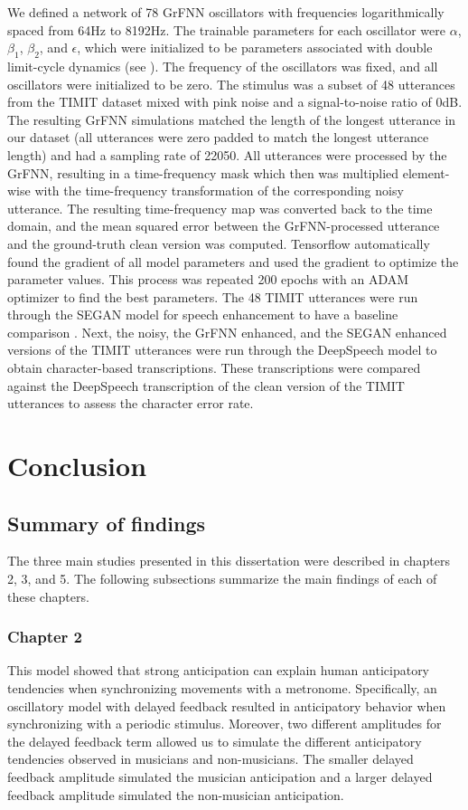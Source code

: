 \documentclass{report}
\begin{document}
We defined a network of 78 GrFNN oscillators with frequencies logarithmically spaced from 64Hz to 8192Hz. The trainable parameters for each oscillator were $\alpha$, $\beta_1$, $\beta_2$, and $\epsilon$, which were initialized to be parameters associated with double limit-cycle dynamics (see \cite{kim2015signal}). The frequency of the oscillators was fixed, and all oscillators were initialized to be zero. The stimulus was a subset of 48 utterances from the TIMIT dataset \cite{garofolo1993timit} mixed with pink noise and a signal-to-noise ratio of 0dB. The resulting GrFNN simulations matched the length of the longest utterance in our dataset (all utterances were zero padded to match the longest utterance length) and had a sampling rate of 22050. All utterances were processed by the GrFNN, resulting in a time-frequency mask which then was multiplied element-wise with the time-frequency transformation of the corresponding noisy utterance. The resulting time-frequency map was converted back to the time domain, and the mean squared error between the GrFNN-processed utterance and the ground-truth clean version was computed. Tensorflow automatically found the gradient of all model parameters and used the gradient to optimize the parameter values. This process was repeated 200 epochs with an ADAM optimizer \cite{kingma2014adam} to find the best parameters. The 48 TIMIT utterances were run through the SEGAN model for speech enhancement to have a baseline comparison \cite{pascual2017segan}. Next, the noisy, the GrFNN enhanced, and the SEGAN enhanced versions of the TIMIT utterances were run through the DeepSpeech model \cite{hannun2014deep} to obtain character-based transcriptions. These transcriptions were compared against the DeepSpeech transcription of the clean version of the TIMIT utterances to assess the character error rate. 


\chapter{Conclusion}

\section{Summary of findings}
The three main studies presented in this dissertation were described in chapters 2, 3, and 5. The following subsections summarize the main findings of each of these chapters.

\subsection{Chapter 2}
This model showed that strong anticipation can explain human anticipatory tendencies when synchronizing movements with a metronome. Specifically, an oscillatory model with delayed feedback resulted in anticipatory behavior when synchronizing with a periodic stimulus. Moreover, two different amplitudes for the delayed feedback term allowed us to simulate the different anticipatory tendencies observed in musicians and non-musicians. The smaller delayed feedback amplitude simulated the musician anticipation and a larger delayed feedback amplitude simulated the non-musician anticipation. 
    
\end{document}
